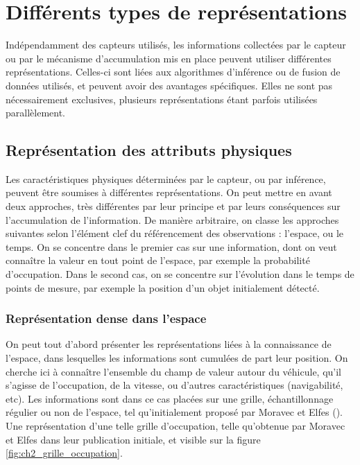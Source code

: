 \section{Différents types de représentations}
Indépendamment des capteurs utilisés, les informations collectées par le capteur ou par le mécanisme d'accumulation mis en place peuvent utiliser différentes représentations. Celles-ci sont liées aux algorithmes d'inférence ou de fusion de données utilisés, et peuvent avoir des avantages spécifiques. Elles ne sont pas nécessairement exclusives, plusieurs représentations étant parfois utilisées parallèlement.

\subsection{Représentation des attributs physiques}
Les caractéristiques physiques déterminées par le capteur, ou par inférence, peuvent être soumises à différentes représentations. On peut mettre en avant deux approches, très différentes par leur principe et par leurs conséquences sur l'accumulation de l'information. De manière arbitraire, on classe les approches suivantes selon l'élément clef du référencement des observations : l'espace, ou le temps. On se concentre dans le premier cas sur une information, dont on veut connaître la valeur en tout point de l'espace, par exemple la probabilité d'occupation. Dans le second cas, on se concentre sur l'évolution dans le temps de points de mesure, par exemple la position d'un objet initialement détecté.\\

\subsubsection{Représentation dense dans l'espace}
On peut tout d'abord présenter les représentations liées à la connaissance de l'espace, dans lesquelles les informations sont cumulées de part leur position. On cherche ici à connaître l'ensemble du champ de valeur autour du véhicule, qu'il s'agisse de l'occupation, de la vitesse, ou d'autres caractéristiques (navigabilité, etc). Les informations sont dans ce cas placées sur une \og grille\fg{}, échantillonnage régulier ou non de l'espace, tel qu'initialement proposé par Moravec et Elfes (\cite{Moravec1985, Elfes1989a,Elfes1987}). Une représentation d'une telle grille d'occupation, telle qu'obtenue par Moravec et Elfes dans leur publication initiale, et visible sur la figure \ref{fig:ch2_grille_occupation}. \\

